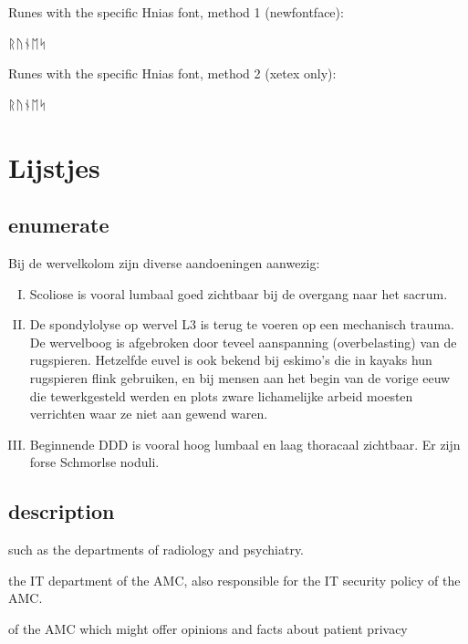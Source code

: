 Runes with the specific Hnias font, method 1 (newfontface):

{\runes ᚱᚢᚾᛖᛋ}

Runes with the specific Hnias font, method 2 (xetex only):

\setmainfont[Path=_example/]{Hnias31_runes.ttf}
ᚱᚢᚾᛖᛋ
\setmainfont{Linux Libertine O}

\section{Lijstjes}

\subsection{enumerate}

Bij de wervelkolom zijn diverse aandoeningen aanwezig:
\begin{enumerate}[I.] %
\item Scoliose is vooral lumbaal goed zichtbaar bij de overgang naar het sacrum.
\item De spondylolyse op wervel L3 is terug te voeren op een mechanisch trauma. De wervelboog is afgebroken door teveel aanspanning (overbelasting) van de rugspieren. Hetzelfde euvel is ook bekend bij eskimo's die in kayaks hun rugspieren flink gebruiken, en bij mensen aan het begin van de vorige eeuw die tewerkgesteld werden en plots zware lichamelijke arbeid moesten verrichten waar ze niet aan gewend waren.
\item Beginnende DDD is vooral hoog lumbaal en laag thoracaal zichtbaar. Er zijn forse Schmorlse noduli.
\end{enumerate}

\subsection{description}

\begin{description}[style=sameline,leftmargin=3cm] %
\item[Data users] such as the departments of radiology and psychiatry.
\item[ADICT] the IT department of the AMC, also responsible for the IT security policy of the AMC.
\item[Ethical Board] of the AMC which might offer opinions and facts about patient privacy
\end{description}


